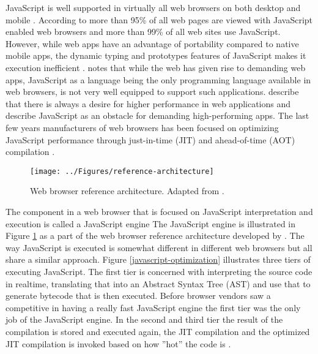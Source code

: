 JavaScript is well supported in virtually all web browsers on both desktop and mobile \parencite{Zakai2011}. According to \textcite{TiwariSolihin2012} more than 95\% of all web pages are viewed with JavaScript enabled web browsers and more than 99\% of all web sites use JavaScript. However, while web apps have an advantage of portability compared to native mobile apps, the dynamic typing and prototypes features of JavaScript makes it execution inefficient \parencite{ParkJungMoon2015}. \textcite{HaasRossbergSchuffTitzerHolmanGohmanWagnerZakaiBastien2017} notes that while the web has given rise to demanding web apps, JavaScript as a language being the only programming language available in web browsers, is not very well equipped to support such applications. \textcite{ReiserBlaser2017} describe that there is always a desire for higher performance in web applications and \textcite{Zakai2018} describe JavaScript as an obstacle for demanding high-performing apps. The last few years manufacturers of web browsers has been focused on optimizing JavaScript performance through just-in-time (JIT) and ahead-of-time (AOT) compilation \parencite{HerreraChenLavoieHendren2018}.

\begin{figure}[!h]
\centering
\texttt{[image: ../Figures/reference-architecture]}
\caption{Web browser reference architecture. Adapted from \textcite{GrosskurthGodfrey2005}.}
\label{reference-architecture}
\end{figure}

The component in a web browser that is focused on JavaScript interpretation and execution is called a JavaScript engine \parencite{JeonChoi2012} The JavaScript engine is illustrated in Figure \ref{reference-architecture} as a part of the web browser reference architecture developed by \textcite{GrosskurthGodfrey2005}. The way JavaScript is executed is somewhat different in different web browsers but all share a similar approach. Figure \ref{javascript-optimization} illustrates three tiers of executing JavaScript. The first tier is concerned with interpreting the source code in realtime, translating that into an Abstract Syntax Tree (AST) and use that to generate bytecode that is then executed. Before browser vendors saw a competitive in having a really fast JavaScript engine the first tier was the only job of the JavaScript engine. In the second and third tier the result of the compilation is stored and executed again, the JIT compilation and the optimized JIT compilation is invoked based on how ''hot'' the code is \parencite{KedlayaRobatmiliHardekopf2015,ParkKimParkMoon2018}.

